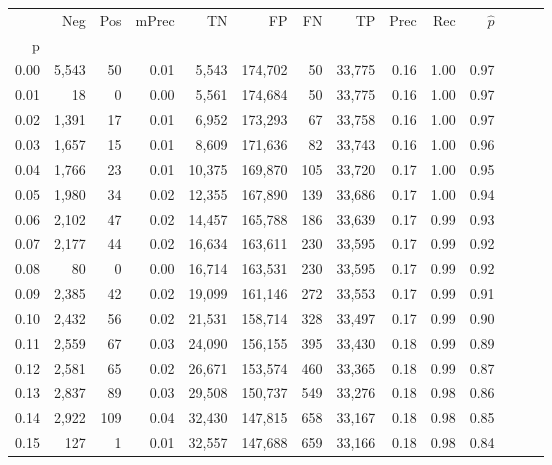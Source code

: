 \begin{tabular}{rrrrrrrrrrrrrr}
\toprule
{} &    Neg &    Pos & mPrec &       TN &       FP &      FN &      TP &  Prec &   Rec & $\hat{p}$ \\
p    &        &        &       &          &          &         &         &       &       &           \\
\midrule
0.00 &  5,543 &     50 &  0.01 &    5,543 &  174,702 &      50 &  33,775 &  0.16 &  1.00 &      0.97 \\
0.01 &     18 &      0 &  0.00 &    5,561 &  174,684 &      50 &  33,775 &  0.16 &  1.00 &      0.97 \\
0.02 &  1,391 &     17 &  0.01 &    6,952 &  173,293 &      67 &  33,758 &  0.16 &  1.00 &      0.97 \\
0.03 &  1,657 &     15 &  0.01 &    8,609 &  171,636 &      82 &  33,743 &  0.16 &  1.00 &      0.96 \\
0.04 &  1,766 &     23 &  0.01 &   10,375 &  169,870 &     105 &  33,720 &  0.17 &  1.00 &      0.95 \\
0.05 &  1,980 &     34 &  0.02 &   12,355 &  167,890 &     139 &  33,686 &  0.17 &  1.00 &      0.94 \\
0.06 &  2,102 &     47 &  0.02 &   14,457 &  165,788 &     186 &  33,639 &  0.17 &  0.99 &      0.93 \\
0.07 &  2,177 &     44 &  0.02 &   16,634 &  163,611 &     230 &  33,595 &  0.17 &  0.99 &      0.92 \\
0.08 &     80 &      0 &  0.00 &   16,714 &  163,531 &     230 &  33,595 &  0.17 &  0.99 &      0.92 \\
0.09 &  2,385 &     42 &  0.02 &   19,099 &  161,146 &     272 &  33,553 &  0.17 &  0.99 &      0.91 \\
0.10 &  2,432 &     56 &  0.02 &   21,531 &  158,714 &     328 &  33,497 &  0.17 &  0.99 &      0.90 \\
0.11 &  2,559 &     67 &  0.03 &   24,090 &  156,155 &     395 &  33,430 &  0.18 &  0.99 &      0.89 \\
0.12 &  2,581 &     65 &  0.02 &   26,671 &  153,574 &     460 &  33,365 &  0.18 &  0.99 &      0.87 \\
0.13 &  2,837 &     89 &  0.03 &   29,508 &  150,737 &     549 &  33,276 &  0.18 &  0.98 &      0.86 \\
0.14 &  2,922 &    109 &  0.04 &   32,430 &  147,815 &     658 &  33,167 &  0.18 &  0.98 &      0.85 \\
0.15 &    127 &      1 &  0.01 &   32,557 &  147,688 &     659 &  33,166 &  0.18 &  0.98 &      0.84 \\

\end{tabular}
